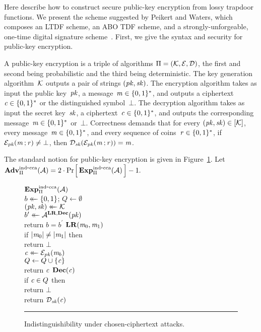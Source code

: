 \label{sec-pke}

Here describe how to construct \indcca secure public-key encryption from lossy
trapdoor functions. We present the scheme suggested by Peikert and Waters, which
composes an LTDF scheme, an ABO TDF scheme, and a strongly-unforgeable, one-time
digital signature scheme~\cite[Section 4.3]{pw08}.
%
First, we give the syntax and security for public-key encryption.

A public-key encryption is a triple of algorithms $\mathrm{\Pi} = (\mathcal{K}, \mathcal{E}, \mathcal{D})$,
the first and second being probabilistic and the third being deterministic.
%
The key generation algorithm~$\mathcal{K}$ outputs a pair of strings $(\mathit{pk}, \mathit{sk})$.
%
The encryption algorithm takes as input the public key~$\mathit{pk}$, a message~$\mathit{m}
\in \{0,1\}^*$, and outputs a ciphertext~$\mathit{c} \in \{0,1\}^*$ or the distinguished
symbol~$\bot$.
%
The decryption algorithm takes as input the secret key~$\mathit{sk}$, a
ciphertext~$\mathit{c} \in \{0,1\}^*$, and outputs the corresponding message~$\mathit{m} \in
\{0,1\}^*$ or~$\bot$.
%
Correctness demands that for every $(\mathit{pk}, \mathit{sk}) \in [\mathcal{K}]$, every message~$\mathit{m}
\in\{0,1\}^*$, and every sequence of coins~$\mathit{r}\in\{0,1\}^*$, if $\mathcal{E}_{\mathit{pk}}(\mathit{m}
\,;\mathit{r}) \ne \bot$, then $\mathcal{D}_{\mathit{sk}}(\mathcal{E}_{\mathit{pk}}(\mathit{m} \,;\mathit{r})) = \mathit{m}$.

The standard \indcca notion for public-key encryption is given in
Figure~\ref{fig-indcca}. Let
$
  \Adv{\indcca}_\pkescheme(\advA) = 2\cdot
  \prob{\Exp{\indcca}_\pkescheme(\advA)} - 1.
$
%
\begin{figure}[t]
  {
    \underline{$\Exp{\indcca}_\pkescheme(\advA)$}\\[2pt]
      $b \mathrel{\leftarrow\mkern-14mu\leftarrow} \{0,1\}$; $Q \gets \emptyset$\\
      $(\mathit{pk}, \mathit{sk}) \mathrel{\leftarrow\mkern-14mu\leftarrow} \mathcal{K}$\\
      $b^\prime \mathrel{\leftarrow\mkern-14mu\leftarrow} \mathcal{A}^{\mathbf{LR},\mathbf{Dec}}(\mathit{pk})$\\
      return $b=b^\prime$
    }
    {
    \underline{$\mathbf{LR}(\mathit{m}_0, \mathit{m}_1)$}\\[2pt]
      if $|\mathit{m}_0| \ne |\mathit{m}_1|$ then\\
      \tab return $\bot$\\
      $\mathit{c} \mathrel{\leftarrow\mkern-14mu\leftarrow} \mathcal{E}_{\mathit{pk}}(\mathit{m}_b)$\\
      $Q \gets Q \cup \{\mathit{c}\}$\\
      return $\mathit{c}$
    }
    {
    \underline{$\mathbf{Dec}(\mathit{c})$}\\[2pt]
      if $\mathit{c} \in Q$ then\\
      \tab return $\bot$\\
      return $\mathcal{D}_{\mathit{sk}}(\mathit{c})$
  }
  \caption{Indistinguishibility under chosen-ciphertext attacks.}
  \label{fig-indcca}
  \vspace{6pt}
  \hrule
\end{figure}

